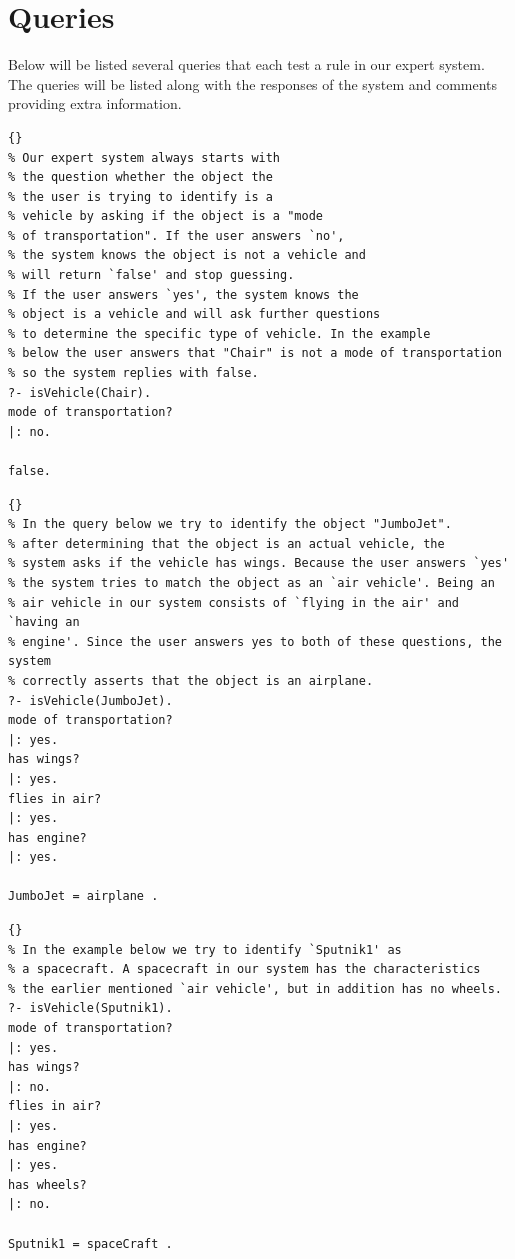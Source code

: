 \newpage
\section{Queries} \label{man-queries}
Below will be listed several queries that each test a rule in our expert system.
The queries will be listed along with the responses of the system and comments
providing extra information.

\begin{lstlisting}{}
% Our expert system always starts with
% the question whether the object the
% the user is trying to identify is a
% vehicle by asking if the object is a "mode
% of transportation". If the user answers `no',
% the system knows the object is not a vehicle and
% will return `false' and stop guessing.
% If the user answers `yes', the system knows the
% object is a vehicle and will ask further questions
% to determine the specific type of vehicle. In the example
% below the user answers that "Chair" is not a mode of transportation
% so the system replies with false.
?- isVehicle(Chair).
mode of transportation?
|: no.

false.
\end{lstlisting}

\begin{lstlisting}{}
% In the query below we try to identify the object "JumboJet".
% after determining that the object is an actual vehicle, the
% system asks if the vehicle has wings. Because the user answers `yes'
% the system tries to match the object as an `air vehicle'. Being an
% air vehicle in our system consists of `flying in the air' and `having an
% engine'. Since the user answers yes to both of these questions, the system
% correctly asserts that the object is an airplane.
?- isVehicle(JumboJet).
mode of transportation?
|: yes.
has wings?
|: yes.
flies in air?
|: yes.
has engine?
|: yes.

JumboJet = airplane .
\end{lstlisting}

\begin{lstlisting}{}
% In the example below we try to identify `Sputnik1' as
% a spacecraft. A spacecraft in our system has the characteristics
% the earlier mentioned `air vehicle', but in addition has no wheels.
?- isVehicle(Sputnik1).
mode of transportation?
|: yes.
has wings?
|: no.
flies in air?
|: yes.
has engine?
|: yes.
has wheels?
|: no.

Sputnik1 = spaceCraft .
\end{lstlisting}


